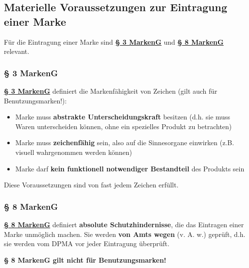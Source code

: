 \documentclass[12pt,A4]{extarticle}
\newcommand{\highlight}[1]{\textcolor{highlightColor}{\textbf{#1}}}
\newcommand{\markenG}[2][]{\textbf{\textcolor{markenGesetzLink}{\href{https://www.gesetze-im-internet.de/markeng/__#2.html}{§ #2 \ifthenelse{\equal{#1}{}}{}{#1 }MarkenG}}}}
\begin{document}
\subsection{Materielle Voraussetzungen zur Eintragung einer Marke}
Für die Eintragung einer Marke sind \markenG{3} und \markenG{8} relevant.

\subsubsection{§ 3 MarkenG}
\markenG{3} definiert die Markenfähigkeit von Zeichen (gilt auch für Benutzungsmarken!):
\begin{itemize}
  \item{Marke muss \highlight{abstrakte Unterscheidungskraft} besitzen (d.h. sie muss Waren unterscheiden können, ohne ein spezielles Produkt zu betrachten)}
  \item{Marke muss \textbf{zeichenfähig} sein, also auf die Sinnesorgane einwirken (z.B. visuell wahrgenommen werden können)}
  \item{Marke darf \textbf{kein funktionell notwendiger Bestandteil} des Produkts sein}
\end{itemize}
Diese Voraussetzungen sind von fast jedem Zeichen erfüllt.

\subsubsection{§ 8 MarkenG}
\markenG{8} definiert \highlight{absolute Schutzhindernisse}, die das Eintragen einer Marke unmöglich machen.
Sie werden \textbf{von Amts wegen} (v. A. w.) geprüft, d.h. sie werden vom DPMA vor jeder Eintragung überprüft.\par
\textbf{§ 8 MarkenG gilt nicht für Benutzungsmarken!}
\end{document}
